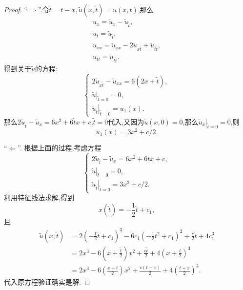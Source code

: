 \documentclass[a4paper,oneside,12pt]{ctexart}
\theoremstyle{plain}
\theoremstyle{nonumberplain}
\theoremstyle{nonumberplain}
\newtheorem{proof}{证明.}
\newcommand{\cond}[2]{\left. #1\right|_{#2}}
\begin{document}
    \begin{proof}
        ``$\Rightarrow$''.令$\tilde{t}=t-x,\tilde{u}(x,\tilde{t})=u(x,t)$,那么 
        \begin{gather*}
            u_x=\tilde{u}_x-\tilde{u}_{\tilde{t}},\\
            u_t=\tilde{u}_{\tilde{t}},\\
            u_{xx}=\tilde{u}_{xx}-2\tilde{u}_{x\tilde{t}}+\tilde{u}_{\tilde{t}\tilde{t}},\\
            u_{tt}=\tilde{u}_{\tilde{t}\tilde{t}}.
        \end{gather*}
        得到关于$\tilde{u}$的方程:
        \begin{equation*}
            \begin{cases}
                2\tilde{u}_{x\tilde{t}}-\tilde{u}_{xx}=6(2x+\tilde{t}),\\
                \cond{\tilde{u}}{\tilde{t}=0}=0,\\
                \cond{\tilde{u}_{\tilde{t}}}{\tilde{t}=0}=u_1(x).
            \end{cases}
        \end{equation*}
        那么$2\tilde{u}_{\tilde{t}}-\tilde{u}_x=6x^2+6\tilde{t}x+c$,$\tilde{t}=0$代入,又因为$\tilde{u}(x,0)=0$,那么$\cond{\tilde{u}_x}{\tilde{t}=0}=0$,则
        \begin{equation*}
           u_1(x)=3x^2+c/2. 
        \end{equation*}

        ``$\Leftarrow$''.
        根据上面的过程,考虑方程
        \begin{equation*}
            \begin{cases}
                2\tilde{u}_{\tilde{t}}-\tilde{u}_x=6x^2+6\tilde{t}x+c,\\
                \cond{\tilde{u}}{\tilde{t}=0}=0,\\
                \cond{\tilde{u}_{\tilde{t}}}{\tilde{t}=0}=3x^2+c/2.
            \end{cases}
        \end{equation*}
        利用特征线法求解,得到 
        \begin{equation*}
            x(\tilde{t})=-\frac{1}{2}\tilde{t}+c_1,
        \end{equation*}
        且
        \begin{align*}
            \tilde{u}(x,\tilde{t})&=2\left(-\frac{1}{2}\tilde{t}+c_1\right)^3-6c_1\left(-\frac{1}{2}t^2+c_1\right)^2+\frac{c}{2}\tilde{t}+4c_1^3\\
            &=2x^3-6\left(x+\frac{\tilde{t}}{2}\right)x^2+\frac{c\tilde{t}}{2}+4\left(x+\frac{t}{2}\right)^3\\
            &=2x^3-6\left(\frac{x+t}{2}\right)x^2+\frac{c(t-x)}{2}+4\left(\frac{t+x}{2}\right)^3.
        \end{align*}
        代入原方程验证确实是解.


\end{proof}
\end{document}
